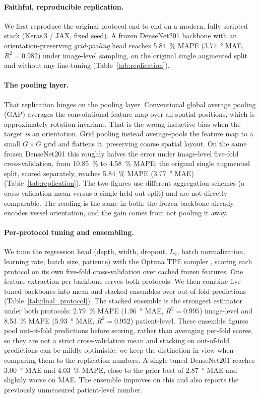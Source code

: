 \paragraph{Faithful, reproducible replication.}
We first reproduce the original protocol end to end on a modern, fully scripted
stack (Keras\,3 / JAX, fixed seed). A frozen DenseNet201 backbone
\citep{Huang2017} with an orientation-preserving \emph{grid-pooling} head reaches
\SI{5.84}{\percent} MAPE (\SI{3.77}{\degree} MAE, $R^2=0.982$) under image-level
sampling, on the original single augmented split and without any fine-tuning
(Table~\ref{tab:replication}).

\paragraph{The pooling layer.}
That replication hinges on the pooling layer. Conventional global average pooling
(GAP) averages the convolutional feature map over all spatial positions, which is
approximately rotation-invariant. That is the wrong inductive bias when the target
\emph{is} an orientation. Grid pooling instead average-pools the feature map to a
small $G\times G$ grid and flattens it, preserving coarse spatial layout. On the
same frozen DenseNet201 this roughly halves the error under image-level five-fold
cross-validation, from \SI{10.85}{\percent} to \SI{4.58}{\percent} MAPE; the
original single augmented split, scored separately, reaches \SI{5.84}{\percent}
MAPE (\SI{3.77}{\degree} MAE) (Table~\ref{tab:replication}). The two figures use
different aggregation schemes (a cross-validation mean versus a single held-out
split) and are not directly comparable. The reading is the same in both: the
frozen backbone already encodes vessel orientation, and the gain comes from not
pooling it away.

\paragraph{Per-protocol tuning and ensembling.}
We tune the regression head (depth, width, dropout, $L_2$, batch normalization,
learning rate, batch size, patience) with the Optuna TPE sampler
\citep{Akiba2019,Bergstra2011}, scoring each protocol on its own five-fold
cross-validation over cached frozen features. One feature extraction per backbone
serves both protocols. We then combine five tuned backbones into mean and stacked
\citep{Wolpert1992} ensembles over out-of-fold predictions
(Table~\ref{tab:dual_protocol}). The stacked ensemble is the strongest estimator
under both protocols: \SI{2.79}{\percent} MAPE (\SI{1.96}{\degree} MAE,
$R^2=0.995$) image-level and \SI{8.53}{\percent} MAPE (\SI{5.93}{\degree} MAE,
$R^2=0.952$) patient-level. These ensemble figures pool out-of-fold predictions
before scoring, rather than averaging per-fold scores, so they are not a strict
cross-validation mean and stacking on out-of-fold predictions can be mildly
optimistic; we keep the distinction in view when comparing them to the replication
numbers. A single tuned DenseNet201 reaches \SI{3.00}{\degree} MAE and
\SI{4.03}{\percent} MAPE, close to the prior best of \SI{2.87}{\degree} MAE and
slightly worse on MAE. The ensemble improves on this and also reports the
previously unmeasured patient-level number.


